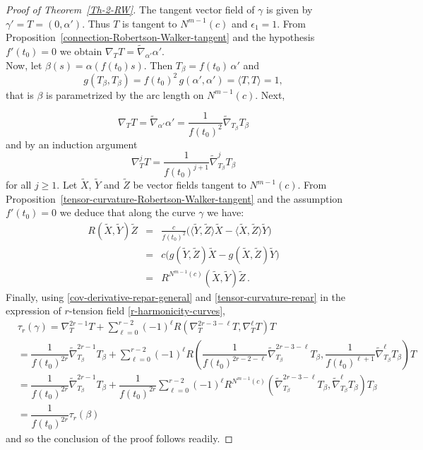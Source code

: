 \documentclass[11pt]{amsart}
\theoremstyle{plain}
\theoremstyle{definition}
\numberwithin{equation}{section}
\begin{document}
\begin{proof}[Proof of Theorem~\ref{Th-2-RW}]
The tangent vector field of $\gamma$ is given by $\gamma' = T = (0, \alpha')$. Thus $T$ is tangent to $N^{m-1}(c)$ and $\epsilon_1 = 1$. From Proposition~\ref{connection-Robertson-Walker-tangent} and the hypothesis $f'(t_0)=0$ we obtain $\nabla_T T =  \widetilde{\nabla}_{\alpha'} \alpha'$.\\
Now, let $\beta(s) = \alpha( f(t_0) s)$. Then $T_\beta = f(t_0)\,\alpha'$ and 
\[
g (T_\beta, T_\beta) = f(t_0)^2 \, g(\alpha', \alpha') = \langle T, T \rangle = 1,
\] 
that is $\beta$ is parametrized by the arc length on $N^{m-1}(c)$. Next,

\begin{equation}\label{cov-derivative-repar}
\nabla_T T =  \widetilde{\nabla}_{\alpha'} \alpha' = \dfrac{1}{f(t_0)^2} \widetilde{\nabla}_{T_\beta}T_\beta
\end{equation}
and by an induction argument
\begin{equation}\label{cov-derivative-repar-general}
\nabla^j_T T = \dfrac{1}{f(t_0)^{j+1}} \widetilde{\nabla}^j_{T_\beta}T_\beta
\end{equation}
for all $j \geq 1$. Let $\widetilde{X}$, $\widetilde{Y}$ and $\widetilde{Z}$ be vector fields tangent to $N^{m-1}(c)$. From Proposition~\ref{tensor-curvature-Robertson-Walker-tangent} and the assumption $f'(t_0)=0$ we deduce that along the curve $\gamma$ we have:
\begin{eqnarray}\label{tensor-curvature-repar}\nonumber
R(\widetilde{X}, \widetilde{Y}) \widetilde{Z}& = &\frac{c}{f(t_0)^2} \big( \langle \widetilde{Y}, \widetilde{Z}\rangle \widetilde{X} - \langle \widetilde{X}, \widetilde{Z}\rangle \widetilde{Y} \big)\\
&=& c \big( g(\widetilde{Y}, \widetilde{Z}) \widetilde{X}  - g( \widetilde{X}, \widetilde{Z}) \widetilde{Y} \big) \\\nonumber
&=& R^{N^{m-1}(c)}(\widetilde{X}, \widetilde{Y}) \widetilde{Z}\,.
\end{eqnarray}
Finally, using \eqref{cov-derivative-repar-general} and \eqref{tensor-curvature-repar} in the expression of $r$-tension field \eqref{r-harmonicity-curves},
\[
\begin{aligned}
&\tau_r(\gamma)=\nabla^{2r-1}_T T+ \sum_{\ell=0}^{r-2}(-1)^\ell R\left (\nabla^{2r-3-\ell}_T T ,\nabla^{\ell}_T T\right )T\\
&= \dfrac{1}{f(t_0)^{2r}} \widetilde{\nabla}^{2r-1}_{T_\beta}T_\beta + \sum_{\ell=0}^{r-2}(-1)^\ell R\left (\dfrac{1}{f(t_0)^{2r-2-\ell}} \widetilde{\nabla}^{2r-3-\ell}_{T_\beta}T_\beta,\dfrac{1}{f(t_0)^{\ell+1}} \widetilde{\nabla}^{\ell}_{T_\beta}T_\beta \right )T\\
&= \dfrac{1}{f(t_0)^{2r}} \widetilde{\nabla}^{2r-1}_{T_\beta}T_\beta + \dfrac{1}{f(t_0)^{2r}}\sum_{\ell=0}^{r-2}(-1)^\ell R^{N^{m-1}(c)}\left ( \widetilde{\nabla}^{2r-3-\ell}_{T_\beta}T_\beta, \widetilde{\nabla}^{\ell}_{T_\beta}T_\beta \right )T_\beta\\
& =  \dfrac{1}{f(t_0)^{2r}} \tau_r(\beta)
\end{aligned}
\]
and so the conclusion of the proof follows readily.
\end{proof}
\end{document}
